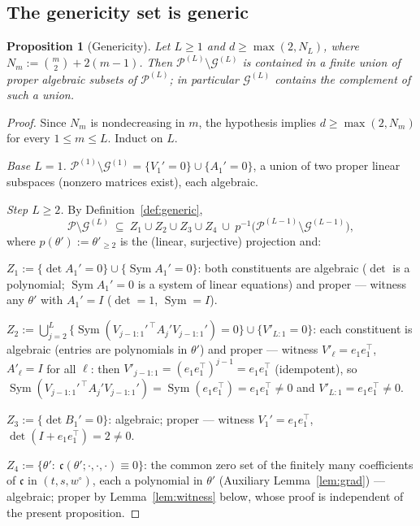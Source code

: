 \documentclass[11pt]{article}
\newtheorem{proposition}[theorem]{Proposition}
\theoremstyle{definition}
\theoremstyle{remark}
\theoremstyle{plain}
\newcommand{\cP}{\mathcal{P}}
\newcommand{\cG}{\mathcal{G}}
\newcommand{\Sym}{\operatorname{Sym}}
\begin{document}
\subsection{The genericity set is generic}

\begin{proposition}[Genericity]\label{prop:genericnonempty}
Let $L\ge1$ and $d\ge\max(2,N_L)$, where $N_m:=\binom m2+2(m-1)$.  Then
$\cP^{(L)}\setminus\cG^{(L)}$ is contained in a finite union of proper algebraic
subsets of $\cP^{(L)}$; in particular $\cG^{(L)}$ contains the complement of such a
union.
\end{proposition}

\begin{proof}
Since $N_m$ is nondecreasing in $m$, the hypothesis implies $d\ge\max(2,N_m)$ for
every $1\le m\le L$.  Induct on $L$.

\emph{Base $L=1$.}  $\cP^{(1)}\setminus\cG^{(1)}=\{V_1'=0\}\cup\{A_1'=0\}$, a union of
two proper linear subspaces (nonzero matrices exist), each algebraic.

\emph{Step $L\ge2$.}  By Definition~\ref{def:generic},
\[
\cP\setminus\cG^{(L)}\ \subseteq\
Z_1\cup Z_2\cup Z_3\cup Z_4\ \cup\ p^{-1}\big(\cP^{(L-1)}\setminus\cG^{(L-1)}\big),
\]
where $p(\theta'):=\theta'_{\ge2}$ is the (linear, surjective) projection and:

$Z_1:=\{\det A_1'=0\}\cup\{\Sym A_1'=0\}$: both constituents are algebraic ($\det$ is
a polynomial; $\Sym A_1'=0$ is a system of linear equations) and proper --- witness
any $\theta'$ with $A_1'=I$ ($\det=1$, $\Sym=I$).

$Z_2:=\bigcup_{j=2}^L\{\Sym(V_{j-1:1}'^{\,\top}A_j'V_{j-1:1}')=0\}\cup\{V'_{L:1}=0\}$:
each constituent is algebraic (entries are polynomials in $\theta'$) and proper ---
witness $V'_\ell=e_1e_1^\top$, $A'_\ell=I$ for all $\ell$: then
$V'_{j-1:1}=(e_1e_1^\top)^{j-1}=e_1e_1^\top$ (idempotent), so
$\Sym(V_{j-1:1}'^{\,\top}A_j'V_{j-1:1}')=\Sym(e_1e_1^\top)=e_1e_1^\top\neq0$ and
$V'_{L:1}=e_1e_1^\top\neq0$.

$Z_3:=\{\det B_1'=0\}$: algebraic; proper --- witness $V_1'=e_1e_1^\top$,
$\det(I+e_1e_1^\top)=2\neq0$.

$Z_4:=\{\theta':\ \mathfrak c(\theta';\cdot,\cdot,\cdot)\equiv0\}$: the common zero
set of the finitely many coefficients of $\mathfrak c$ in $(t,s,w^\circ)$, each a
polynomial in $\theta'$ (Auxiliary Lemma~\ref{lem:grad}) --- algebraic; proper by
Lemma~\ref{lem:witness} below, whose proof is independent of the present proposition.


\end{proof}
\end{document}

